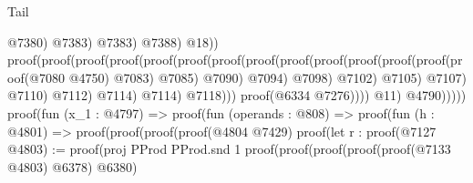 \begin{lexlean}{Tail}
\begin{coremodule}
                                                                            @7380)
                                                                          @7383)
                                                                        @7383)
                                                                      @7388)
                                                                    @18))
                                                              proof(proof(proof(proof(proof(proof(proof(proof(proof(proof(proof(proof(proof(proof(@7080
                                                                                            @4750)
                                                                                          @7083)
                                                                                        @7085)
                                                                                      @7090)
                                                                                    @7094)
                                                                                  @7098)
                                                                                @7102)
                                                                              @7105)
                                                                            @7107)
                                                                          @7110)
                                                                        @7112)
                                                                      @7114)
                                                                    @7114)
                                                                  @7118)))
                                                        proof(@6334 @7276))))
                                                @11)
                                              @4790)))))
                                  proof(fun (x_1 : @4797) =>
                                    proof(fun (operands : @808) =>
                                      proof(fun (h : @4801) =>
                                        proof(proof(proof(proof(@4804 @7429)
                                                proof(let r : proof(@7127
                                                      @4803) := proof(proj PProd PProd.snd 1
                                                    proof(proof(proof(proof(proof(@7133 @4803)
                                                              @6378)
                                                            @6380)

\end{coremodule}
\end{lexlean}
